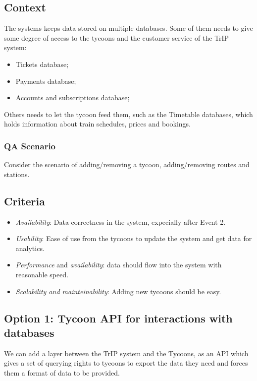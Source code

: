 \subsection*{Context}
The systems keeps data stored on multiple databases. 
Some of them needs to give some degree of access to the tycoons and the customer service of the TrIP system:
\begin{itemize}
    \item Tickets database;
    \item Payments database;
    \item Accounts and subscriptions database;
\end{itemize}

Others needs to let the tycoon feed them, such as the Timetable databases, which holds information about train schedules,
prices and bookings.

\subsubsection*{QA Scenario} %
Consider the scenario of adding/removing a tycoon, adding/removing routes and stations.
\subsection*{Criteria}
\begin{itemize}[noitemsep]
    \item \textit{Availability}: Data correctness in the system, expecially after Event 2.
    \item \textit{Usability}: Ease of use from the tycoons to update the system and get data for analytics.
    \item \textit{Performance} and \textit{availability}: data should flow into the system with reasonable speed.
    \item \textit{Scalability and mainteinability}: Adding new tycoons should be easy.
\end{itemize}

\subsection*{Option 1: Tycoon API for interactions with databases}

We can add a layer between the TrIP system and the Tycoons, as an API which gives a set of querying rights to tycoons to export the data they need and forces them a format of data to be provided.

